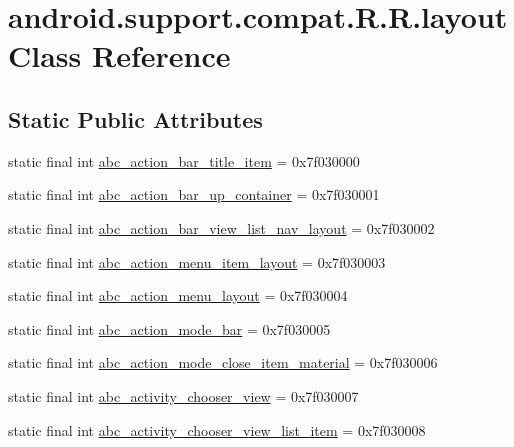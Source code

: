 \hypertarget{classandroid_1_1support_1_1compat_1_1_r_1_1layout}{
\section{android.support.compat.R.R.layout Class Reference}
\label{classandroid_1_1support_1_1compat_1_1_r_1_1layout}
}
\subsection*{Static Public Attributes}
\begin{CompactItemize}
\item 
static final int \hyperlink{classandroid_1_1support_1_1compat_1_1_r_1_1layout_13e416c756e64814c7e7748d53d300ff}{abc\_\-action\_\-bar\_\-title\_\-item} = 0x7f030000
\item 
static final int \hyperlink{classandroid_1_1support_1_1compat_1_1_r_1_1layout_84398128cdee0a5a31f359262751e3de}{abc\_\-action\_\-bar\_\-up\_\-container} = 0x7f030001
\item 
static final int \hyperlink{classandroid_1_1support_1_1compat_1_1_r_1_1layout_009d7b5d862b9397e7124fb3cf366bb7}{abc\_\-action\_\-bar\_\-view\_\-list\_\-nav\_\-layout} = 0x7f030002
\item 
static final int \hyperlink{classandroid_1_1support_1_1compat_1_1_r_1_1layout_3daf5866e26fcecbc76628a3baba72c2}{abc\_\-action\_\-menu\_\-item\_\-layout} = 0x7f030003
\item 
static final int \hyperlink{classandroid_1_1support_1_1compat_1_1_r_1_1layout_96f2abc0f5bea7591528d008142193b0}{abc\_\-action\_\-menu\_\-layout} = 0x7f030004
\item 
static final int \hyperlink{classandroid_1_1support_1_1compat_1_1_r_1_1layout_583e52127366f833a09310e276e1028c}{abc\_\-action\_\-mode\_\-bar} = 0x7f030005
\item 
static final int \hyperlink{classandroid_1_1support_1_1compat_1_1_r_1_1layout_b42959b0df7dfb4fefd51e452900d754}{abc\_\-action\_\-mode\_\-close\_\-item\_\-material} = 0x7f030006
\item 
static final int \hyperlink{classandroid_1_1support_1_1compat_1_1_r_1_1layout_2e366e0b93f50012afaf7cbd22bc3e5e}{abc\_\-activity\_\-chooser\_\-view} = 0x7f030007
\item 
static final int \hyperlink{classandroid_1_1support_1_1compat_1_1_r_1_1layout_1dfc8a59bd20ae3ac0a3abe011fe8db9}{abc\_\-activity\_\-chooser\_\-view\_\-list\_\-item} = 0x7f030008

\end{CompactItemize}
